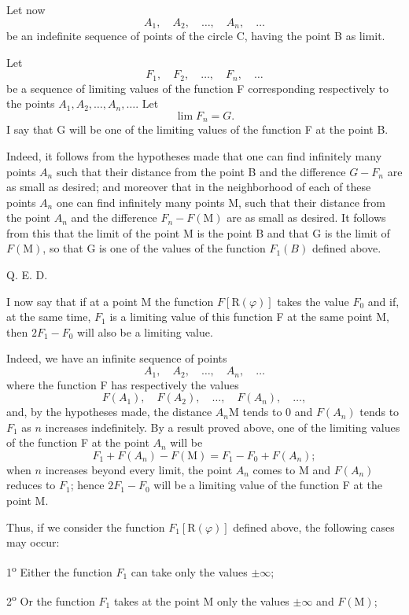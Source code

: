 \documentclass[11pt]{article}
\begin{document}
Let now
\[
A_1,
\quad A_2,
\quad \ldots,
\quad A_n,
\quad \ldots
\]
be an indefinite sequence of points of the circle C, having the point B as limit.

Let
\[
F_1,
\quad F_2,
\quad \ldots,
\quad F_n,
\quad \ldots
\]
be a sequence of limiting values of the function F corresponding respectively to the points $A_1,A_2,\ldots,A_n,\ldots$. Let
\[
\lim F_n=G.
\]
I say that G will be one of the limiting values of the function F at the point B.

Indeed, it follows from the hypotheses made that one can find infinitely many points $A_n$ such that their distance from the point B and the difference $G-F_n$ are as small as desired; and moreover that in the neighborhood of each of these points $A_n$ one can find infinitely many points M, such that their distance from the point $A_n$ and the difference $F_n-F(\mathrm{M})$ are as small as desired. It follows from this that the limit of the point M is the point B and that G is the limit of $F(\mathrm{M})$, so that G is one of the values of the function $F_1(B)$ defined above.
\begin{flushright}Q. E. D.\end{flushright}

I now say that if at a point M the function $F[\mathrm{R}(\varphi)]$ takes the value $F_0$ and if, at the same time, $F_1$ is a limiting value of this function F at the same point M, then $2F_1-F_0$ will also be a limiting value.

Indeed, we have an infinite sequence of points
\[
A_1,
\quad A_2,
\quad \ldots,
\quad A_n,
\quad \ldots
\]
where the function F has respectively the values
\[
F(A_1),
\quad F(A_2),
\quad \ldots,
\quad F(A_n),
\quad \ldots,
\]
and, by the hypotheses made, the distance $A_n\mathrm{M}$ tends to 0 and $F(A_n)$ tends to $F_1$ as $n$ increases indefinitely. By a result proved above, one of the limiting values of the function F at the point $A_n$ will be
\[
F_1+F(A_n)-F(\mathrm{M})=F_1-F_0+F(A_n);
\]
when $n$ increases beyond every limit, the point $A_n$ comes to M and $F(A_n)$ reduces to $F_1$; hence $2F_1-F_0$ will be a limiting value of the function F at the point M.

Thus, if we consider the function $F_1[\mathrm{R}(\varphi)]$ defined above, the following cases may occur:

1\textsuperscript{o} Either the function $F_1$ can take only the values $\pm\infty$;

2\textsuperscript{o} Or the function $F_1$ takes at the point M only the values $\pm\infty$ and $F(\mathrm{M})$;
\end{document}

